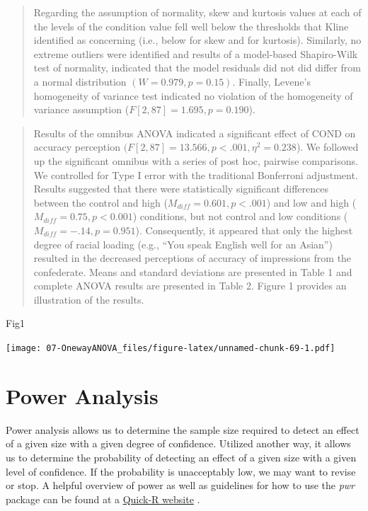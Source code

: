 \documentclass[
  11pt,
]{book}
\newenvironment{Shaded}{\begin{snugshade}}{\end{snugshade}}
\newcommand{\NormalTok}[1]{#1}
\begin{document}
\begin{quote}
Regarding the assumption of normality, skew and kurtosis values at each of the levels of the condition value fell well below the thresholds that Kline \citeyearpar{kline_data_2016} identified as concerning (i.e., below \textbar{} for skew and \textbar{} for kurtosis). Similarly, no extreme outliers were identified and results of a model-based Shapiro-Wilk test of normality, indicated that the model residuals did not did differ from a normal distribution \((W = 0.979, p = 0.15)\). Finally, Levene's homogeneity of variance test indicated no violation of the homogeneity of variance assumption (\(F[2, 87] = 1.695, p = 0.190\)).
\end{quote}

\begin{quote}
Results of the omnibus ANOVA indicated a significant effect of COND on accuracy perception \((F[2,87] = 13.566, p < .001, \eta ^{2} = 0.238\)). We followed up the significant omnibus with a series of post hoc, pairwise comparisons. We controlled for Type I error with the traditional Bonferroni adjustment. Results suggested that there were statistically significant differences between the control and high (\(M_{diff} = 0.601, p < .001\)) and low and high (\(M_{diff} = 0.75, p < 0.001\)) conditions, but not control and low conditions (\(M_{diff} = -.14, p = 0.951\)). Consequently, it appeared that only the highest degree of racial loading (e.g., ``You speak English well for an Asian'') resulted in the decreased perceptions of accuracy of impressions from the confederate. Means and standard deviations are presented in Table 1 and complete ANOVA results are presented in Table 2. Figure 1 provides an illustration of the results.
\end{quote}

\begin{Shaded}
\begin{Highlighting}[]
\NormalTok{Fig1}
\end{Highlighting}
\end{Shaded}

\texttt{[image: 07-OnewayANOVA\_files/figure-latex/unnamed-chunk-69-1.pdf]}

\hypertarget{power-analysis}{%
\section{Power Analysis}\label{power-analysis}}

Power analysis allows us to determine the sample size required to detect an effect of a given size with a given degree of confidence. Utilized another way, it allows us to determine the probability of detecting an effect of a given size with a given level of confidence. If the probability is unacceptably low, we may want to revise or stop. A helpful overview of power as well as guidelines for how to use the \emph{pwr} package can be found at a \href{https://www.statmethods.net/stats/power.html}{Quick-R website} \citep{kabacoff_power_2017}.
\end{document}
